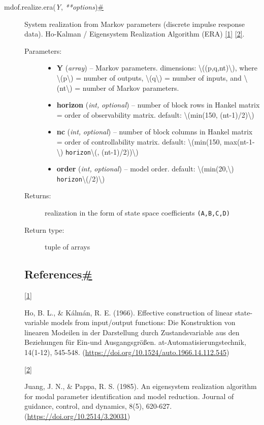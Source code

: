\begin{description}
\item[{ {{mdof.realize.}}{{era}}{(}\emph{{{Y}}},
\emph{{{**}}{{options}}}{)}\protect\hyperlink{mdof.realize.era}{\#}}]
System realization from Markov parameters (discrete impulse response
data). Ho-Kalman / Eigensystem Realization Algorithm (ERA)
\protect\hyperlink{id3}{{{[}}1{{]}}}
\protect\hyperlink{id4}{{{[}}2{{]}}}.

\begin{description}
\item[Parameters{:}]
\begin{itemize}
\item
  \textbf{Y} (\emph{array}) -- Markov parameters. dimensions:
  {\textbackslash{}((p,q,nt)\textbackslash{})}, where
  {\textbackslash{}(p\textbackslash{})} = number of outputs,
  {\textbackslash{}(q\textbackslash{})} = number of inputs, and
  {\textbackslash{}(nt\textbackslash{})} = number of Markov parameters.
\item
  \textbf{horizon} (\emph{int,} \emph{optional}) -- number of block rows
  in Hankel matrix = order of observability matrix. default:
  {\textbackslash{}(min(150, (nt-1)/2)\textbackslash{})}
\item
  \textbf{nc} (\emph{int,} \emph{optional}) -- number of block columns
  in Hankel matrix = order of controllability matrix. default:
  {\textbackslash{}(min(150, max(nt-1-\textbackslash{})}
  \texttt{horizon}{\textbackslash{}(, (nt-1)/2))\textbackslash{})}
\item
  \textbf{order} (\emph{int,} \emph{optional}) -- model order. default:
  {\textbackslash{}(min(20,\textbackslash{})}
  \texttt{horizon}{\textbackslash{}(/2)\textbackslash{})}
\end{itemize}
\item[Returns{:}]
realization in the form of state space coefficients \texttt{(A,B,C,D)}
\item[Return type{:}]
tuple of arrays
\end{description}

\hypertarget{references}{}
\hypertarget{references}{%
\subsection{\texorpdfstring{References\protect\hyperlink{references}{\#}}{References\#}}\label{references}}

{{{[}}\protect\hyperlink{id1}{1}{{]}}}

Ho, Β. L., \& Kálmán, R. E. (1966). Effective construction of linear
state-variable models from input/output functions: Die Konstruktion von
linearen Modeilen in der Darstellung durch Zustandsvariable aus den
Beziehungen für Ein-und Ausgangsgrößen. at-Automatisierungstechnik,
14(1-12), 545-548. (\url{https://doi.org/10.1524/auto.1966.14.112.545})

{{{[}}\protect\hyperlink{id2}{2}{{]}}}

Juang, J. N., \& Pappa, R. S. (1985). An eigensystem realization
algorithm for modal parameter identification and model reduction.
Journal of guidance, control, and dynamics, 8(5), 620-627.
(\url{https://doi.org/10.2514/3.20031})
\end{description}

